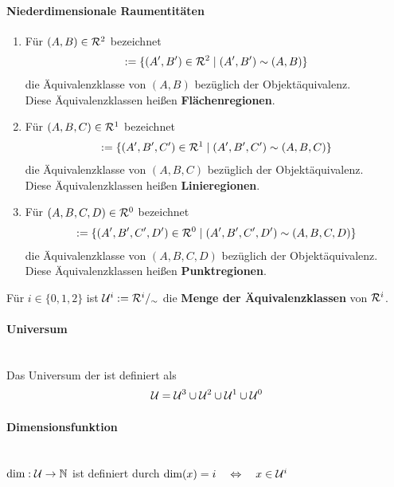 \paragraph{Niederdimensionale Raumentitäten}
%
    \begin{enumerate}
        \item Für $(A,B) \in \mathcal{R}^2$ bezeichnet 
            \begin{align*}
                [A,B] := \{(A',B') \in \rep^2 \mid (A',B') \sim (A,B)\}
            \end{align*}
            die Äquivalenzklasse von $(A,B)$ bezüglich der Objektäquivalenz.\\
            Diese Äquivalenzklassen heißen \textbf{Flächenregionen}.
        \item Für $(A,B,C) \in \mathcal{R}^1$ bezeichnet
            \begin{align*}
                [A,B,C] := \{(A',B',C') \in \rep^1 \mid (A',B',C') \sim (A,B,C)\}
            \end{align*}			 
            die Äquivalenzklasse von $(A,B,C)$ bezüglich der Objektäquivalenz.\\
            Diese Äquivalenzklassen heißen \textbf{Linieregionen}.
        \item Für $(A,B,C,D) \in \mathcal{R}^0$ bezeichnet
            \begin{align*}
                [A,B,C,D] :=
                \{(A',B',C',D') \in \rep^0 \mid (A',B',C',D') \sim (A,B,C,D)\}
            \end{align*}			 
            die Äquivalenzklasse von $(A,B,C,D)$ bezüglich der Objektäquivalenz.\\
            Diese Äquivalenzklassen heißen \textbf{Punktregionen}.
    \end{enumerate}
    \noindent	
        Für $i \in \{0,1,2\}$ ist $\mathcal{U}^i := \mathcal{R}^i /_\sim$ die \textbf{Menge der Äquivalenzklassen} von $\mathcal{R}^i$.\\

        
\paragraph{Universum}\ \\
    Das Universum der \strukt ist definiert als
    \begin{align*}
        \mathcal{U} = \mathcal{U}^3 \cup \mathcal{U}^2 \cup \mathcal{U}^1 \cup \mathcal{U}^0
    \end{align*}
    
    
\paragraph{Dimensionsfunktion}\ \\
$\text{dim} : \mathcal{U} \to \mathbb{N}$ ist definiert durch
            $ \text{dim}(x) = i \quad \Leftrightarrow \quad x \in \mathcal{U}^i $
    
